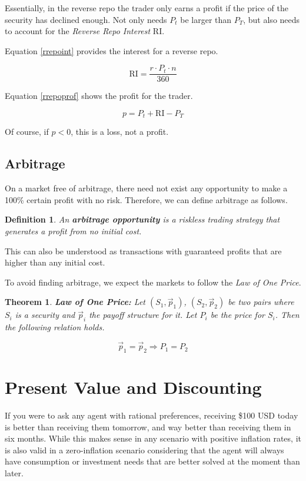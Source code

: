 \documentclass[10pt,letterpaper]{article}
\newtheorem{definition}{Definition}
\newtheorem{theorem}{Theorem}
\begin{document}
Essentially, in the reverse repo the trader only earns a profit if the price of the security has declined enough. Not only needs $P_t$ be larger than $P_T$, but also needs to account for the \emph{Reverse Repo Interest} RI.

Equation \eqref{rrepoint} provides the interest for a reverse repo.

\begin{equation}\label{rrepoint}
\mbox{RI} = \frac{r \cdot P_t \cdot n}{360}
\end{equation}

Equation \eqref{rrepoprof} shows the profit for the trader.

\begin{equation}\label{rrepoprof}
p = P_t + \mbox{RI} - P_T
\end{equation}

Of course, if $p < 0$, this is a loss, not a profit.

\subsection{Arbitrage}
On a market free of arbitrage, there need not exist any opportunity to make a 100\% certain profit with no risk. Therefore, we can define arbitrage as follows.

\begin{definition}
An \emph{\textbf{arbitrage opportunity}} is a riskless trading strategy that generates a profit from no initial cost.
\end{definition}

This can also be understood as transactions with guaranteed profits that are higher than any initial cost.

To avoid finding arbitrage, we expect the markets to follow the \emph{Law of One Price}.

\begin{theorem}
\textbf{\emph{Law of One Price: }} Let $(S_1, \vec{p}_1)$, $(S_2, \vec{p}_2)$ be two pairs where $S_i$ is a security and $\vec{p}_i$ the payoff structure for it. Let $P_i$ be the price for $S_i$. Then the following relation holds.

$$\vec{p}_1 = \vec{p}_2 \Rightarrow P_1 = P_2$$
\end{theorem}

\section{Present Value and Discounting}
If you were to ask any agent with rational preferences, receiving \$100 USD today is better than receiving them tomorrow, and way better than receiving them in six months. While this makes sense in any scenario with positive inflation rates, it is also valid in a zero-inflation scenario considering that the agent will always have consumption or investment needs that are better solved at the moment than later.
\end{document}
